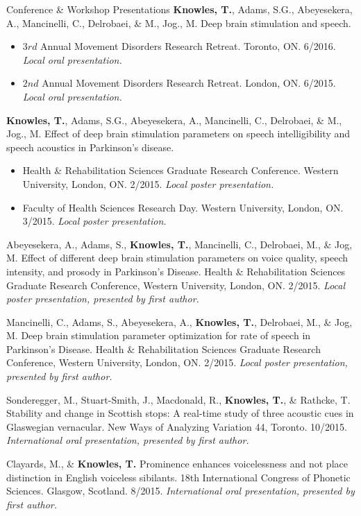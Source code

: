 \documentclass{resume} %
\begin{document}
\begin{rSection}{Conference \& Workshop Presentations}
	{\bf Knowles, T.}, Adams, S.G., Abeyesekera, A., Mancinelli, C., Delrobaei, \& M., Jog., M. Deep brain stimulation and speech.
	\begin{itemize}
				\renewcommand\labelitemi{$\cdot$}
		\item $3rd$ Annual Movement Disorders Research Retreat. Toronto, ON. 6/2016.  \emph{Local oral presentation.}
		\item $2nd$ Annual Movement Disorders Research Retreat. London, ON. 6/2015.  \emph{Local oral presentation.}
	\end{itemize}
	
	{\bf Knowles, T.}, Adams, S.G., Abeyesekera, A., Mancinelli, C., Delrobaei, \& M., Jog., M. Effect of deep brain stimulation parameters on speech intelligibility and speech acoustics in Parkinson's disease. 
	\begin{itemize}
				\renewcommand\labelitemi{$\cdot$}
		\item Health \& Rehabilitation Sciences Graduate Research Conference. Western University, London, ON.  2/2015.  \emph{Local poster presentation.}
		\item Faculty of Health Sciences Research Day. Western University, London, ON. 3/2015.  \emph{Local poster presentation.}
	\end{itemize}
	
	Abeyesekera, A., Adams, S., {\bf Knowles, T.}, Mancinelli, C., Delrobaei, M., \& Jog, M. Effect of different deep brain stimulation parameters on voice quality, speech intensity, and prosody in Parkinson's Disease. Health \& Rehabilitation Sciences Graduate Research Conference, Western University, London, ON. 2/2015.  \emph{Local poster presentation, presented by first author.}
	
	Mancinelli, C., Adams, S., Abeyesekera, A., {\bf Knowles, T.}, Delrobaei, M., \& Jog, M. Deep brain stimulation parameter optimization for rate of speech in Parkinson's Disease. Health \& Rehabilitation Sciences Graduate Research Conference, Western University, London, ON. 2/2015. \emph{Local poster presentation, presented by first author.}
	
	Sonderegger, M., Stuart-Smith, J., Macdonald, R., {\bf Knowles, T.}, \& Rathcke, T. Stability and change in Scottish stops: A real-time study of three acoustic cues in Glaswegian vernacular. New Ways of Analyzing Variation 44, Toronto. 10/2015. \emph{International oral presentation, presented by first author.}
	
	Clayards, M., \& {\bf Knowles, T.} Prominence enhances voicelessness and not place distinction in English voiceless sibilants. 18th International Congress of Phonetic Sciences. Glasgow, Scotland. 8/2015. \emph{International oral presentation, presented by first author.}
	

\end{rSection}
\end{document}

